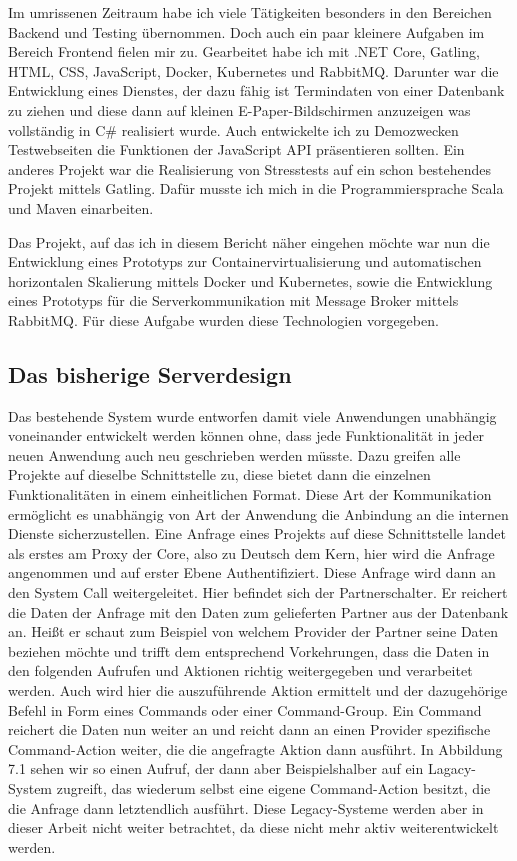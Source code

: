 \documentclass[12pt,a4paper]{scrartcl}
\begin{document}
Im umrissenen Zeitraum habe ich viele Tätigkeiten besonders in den Bereichen Backend und Testing übernommen. Doch auch ein paar kleinere Aufgaben im Bereich Frontend fielen mir zu. Gearbeitet habe ich mit .NET Core, Gatling, HTML, CSS, JavaScript, Docker, Kubernetes und RabbitMQ. 
Darunter war die Entwicklung eines Dienstes, der dazu fähig ist Termindaten von einer Datenbank zu ziehen und diese dann auf kleinen E-Paper-Bildschirmen anzuzeigen was vollständig in C\# realisiert wurde. Auch entwickelte ich zu Demozwecken Testwebseiten die Funktionen der JavaScript API präsentieren sollten. Ein anderes Projekt war die Realisierung von Stresstests auf ein schon bestehendes Projekt mittels Gatling. Dafür musste ich mich in die Programmiersprache Scala und Maven einarbeiten. 

Das Projekt, auf das ich in diesem Bericht näher eingehen möchte war nun die Entwicklung eines Prototyps zur Containervirtualisierung und automatischen horizontalen Skalierung mittels Docker und Kubernetes, sowie die Entwicklung eines Prototyps für die Serverkommunikation mit Message Broker mittels RabbitMQ. Für diese Aufgabe wurden diese Technologien vorgegeben. 

\subsection{Das bisherige Serverdesign}
Das bestehende System wurde entworfen damit viele Anwendungen unabhängig voneinander entwickelt werden können ohne, dass jede Funktionalität in jeder neuen Anwendung auch neu geschrieben werden müsste. Dazu greifen alle Projekte auf dieselbe Schnittstelle zu, diese bietet dann die einzelnen Funktionalitäten in einem einheitlichen Format. Diese Art der Kommunikation ermöglicht es unabhängig von Art der Anwendung die Anbindung an die internen Dienste sicherzustellen. Eine Anfrage eines Projekts auf diese Schnittstelle landet als erstes am Proxy der Core, also zu Deutsch dem Kern, hier wird die Anfrage angenommen und auf erster Ebene Authentifiziert. Diese Anfrage wird dann an den System Call weitergeleitet. Hier befindet sich der Partnerschalter. Er reichert die Daten der Anfrage mit den Daten zum gelieferten Partner aus der Datenbank an. Heißt er schaut zum Beispiel von welchem Provider der Partner seine Daten beziehen möchte und trifft dem entsprechend Vorkehrungen, dass die Daten in den folgenden Aufrufen und Aktionen richtig weitergegeben und verarbeitet werden. Auch wird hier die auszuführende Aktion ermittelt und der dazugehörige Befehl in Form eines Commands oder einer Command-Group. Ein Command reichert die Daten nun weiter an und reicht dann an einen Provider spezifische Command-Action weiter, die die angefragte Aktion dann ausführt. In Abbildung 7.1 sehen wir so einen Aufruf, der dann aber Beispielshalber auf ein Lagacy-System zugreift, das wiederum selbst eine eigene Command-Action besitzt, die die Anfrage dann letztendlich ausführt. Diese Legacy-Systeme werden aber in dieser Arbeit nicht weiter betrachtet, da diese nicht mehr aktiv weiterentwickelt werden.
\end{document}
